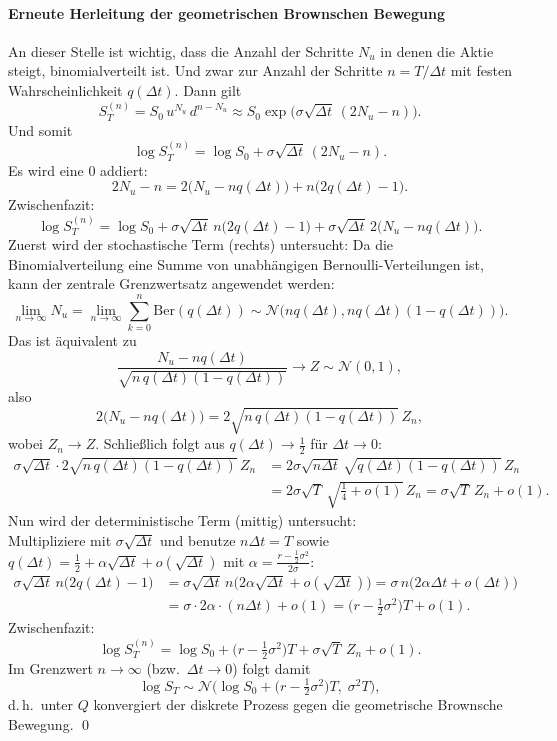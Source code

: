\paragraph{Erneute Herleitung der geometrischen Brownschen Bewegung}
An dieser Stelle ist wichtig, dass die Anzahl der Schritte $N_u$ in denen die Aktie steigt, binomialverteilt ist.
Und zwar zur Anzahl der Schritte $n=T/\Delta t$ mit festen Wahrscheinlichkeit $q(\Delta t)$.
Dann gilt
$$
S_T^{(n)} = S_0\, u^{N_u}\, d^{n-N_u}
\approx S_0 \exp\!\big(\sigma \sqrt{\Delta t}\,(2N_u - n)\big).
$$
Und somit
$$
\log S_T^{(n)}
= \log S_0 + \sigma \sqrt{\Delta t}\,(2N_u - n).
$$
Es wird eine 0 addiert:
$$
2N_u - n
= 2\big(N_u - n q(\Delta t)\big) + n\big(2q(\Delta t)-1\big).
$$
Zwischenfazit:
$$
\log S_T^{(n)}
= \log S_0 + \sigma \sqrt{\Delta t}\, n\big(2q(\Delta t)-1\big)
+ \sigma \sqrt{\Delta t}\, 2\big(N_u - n q(\Delta t)\big).
$$
Zuerst wird der stochastische Term (rechts) untersucht: Da die Binomialverteilung eine Summe von unabhängigen Bernoulli-Verteilungen ist, kann der zentrale Grenzwertsatz angewendet werden:
$$
\lim_{n\to\infty} N_u = \lim_{n \to \infty} \sum_{k=0}^{n}\text{Ber}(q(\Delta t)) \sim \mathcal N\big(n q(\Delta t), n q(\Delta t)(1-q(\Delta t))\big).
$$
Das ist äquivalent zu
$$
\frac{N_u - n q(\Delta t)}{\sqrt{n\,q(\Delta t)(1-q(\Delta t))}} \longrightarrow Z\sim \mathcal N(0,1),
$$
also
$$
2\big(N_u - n q(\Delta t)\big) = 2\sqrt{n\,q(\Delta t)(1-q(\Delta t))}\,Z_n,
$$
wobei $Z_n\longrightarrow Z$.
Schließlich folgt aus $q(\Delta t)\to \tfrac12$ für $\Delta t\to 0$:
$$
\begin{aligned}
\sigma \sqrt{\Delta t}\cdot 2\sqrt{n\,q(\Delta t)(1-q(\Delta t))}\,Z_n
&= 2\sigma \sqrt{n\Delta t}\,\sqrt{q(\Delta t)(1-q(\Delta t))}\,Z_n \\
&= 2\sigma \sqrt{T}\,\sqrt{\tfrac14 + o(1)}\,Z_n
= \sigma \sqrt{T}\,Z_n + o(1).
\end{aligned}
$$
Nun wird der deterministische Term (mittig) untersucht:
\\ Multipliziere mit $\sigma \sqrt{\Delta t}$ und benutze $n\Delta t=T$ sowie $q(\Delta t)=\tfrac12 + \alpha \sqrt{\Delta t} + o(\sqrt{\Delta t})$ mit
$\alpha=\frac{r-\frac12\sigma^2}{2\sigma}$:
$$
\begin{aligned}
\sigma \sqrt{\Delta t}\, n\big(2q(\Delta t)-1\big)
&= \sigma \sqrt{\Delta t}\, n\big(2\alpha \sqrt{\Delta t} + o(\sqrt{\Delta t})\big)
= \sigma\, n \big(2\alpha \Delta t + o(\Delta t)\big) \\
&= \sigma \cdot 2\alpha \cdot (n\Delta t) + o(1)
= \big(r - \tfrac12 \sigma^2\big)T + o(1).
\end{aligned}
$$
Zwischenfazit:
$$
\log S_T^{(n)}
= \log S_0 + \big(r - \tfrac12 \sigma^2\big)T + \sigma \sqrt{T}\,Z_n + o(1).
$$
Im Grenzwert $n\to\infty$ (bzw.\ $\Delta t \to 0$) folgt damit
$$
\log S_T \sim \mathcal N\!\Big(\log S_0 + \big(r - \tfrac12 \sigma^2\big)T,\;\sigma^2 T\Big),
$$
d.\,h.\ unter $Q$ konvergiert der diskrete Prozess gegen die geometrische Brownsche Bewegung.
\qed

